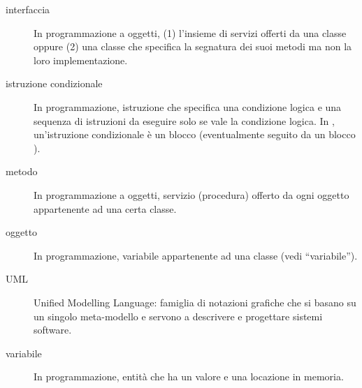 \begin{description}
	\item[interfaccia] In programmazione a oggetti, (1) l'insieme di servizi offerti da una classe oppure (2) una classe che specifica la segnatura dei suoi metodi ma non la loro implementazione.
	\item[istruzione condizionale] In programmazione, istruzione che specifica una condizione logica e una sequenza di istruzioni da eseguire solo se vale la condizione logica. In \proj, un'istruzione condizionale è un blocco  (eventualmente seguito da un blocco ).
	\item[metodo] In programmazione a oggetti, servizio (procedura) offerto da ogni oggetto appartenente ad una certa classe.
	\item[oggetto] In programmazione, variabile appartenente ad una classe (vedi “variabile”).
	\item[UML] Unified Modelling Language: famiglia di notazioni grafiche che si basano su un singolo meta-modello e servono a descrivere e progettare sistemi software.
	\item[variabile] In programmazione, entità che ha un valore e una locazione in memoria.
\end{description}




